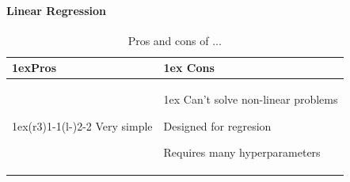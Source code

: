 \documentclass{article}
\begin{document}
        \paragraph{Linear Regression}
        \begin{table}
        \begin{tabularx}{\linewidth}{>{\parskip1ex}X@{\kern4\tabcolsep}>{\parskip1ex}X}
        \toprule
        \hfil\bfseries Pros
        &
        \hfil\bfseries Cons
        \\\cmidrule(r{3\tabcolsep}){1-1}\cmidrule(l{-\tabcolsep}){2-2}
        Very simple\par
        &
        Can't solve non-linear problems\par
        Designed for regresion\par
        Requires many hyperparameters\par
        \\\bottomrule
        \end{tabularx}
        \caption{Pros and cons of ...}
        \end{table}
\end{document}
